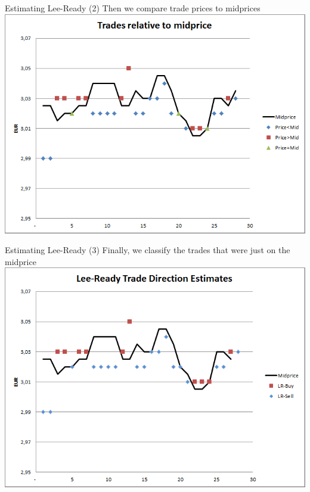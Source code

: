 \documentclass[english,10pt]{beamer}
\begin{document}
\begin{frame}{Estimating Lee-Ready (2)}
	Then we compare trade prices to midprices
	\center
	\includegraphics[scale=0.39]{pics/L2_traderelativemid}
\end{frame}


\begin{frame}{Estimating Lee-Ready (3)}
	Finally, we classify the trades that were just on the midprice
	\center
	\includegraphics[scale=0.39]{pics/L2_leereadyest}
\end{frame}
\end{document}
